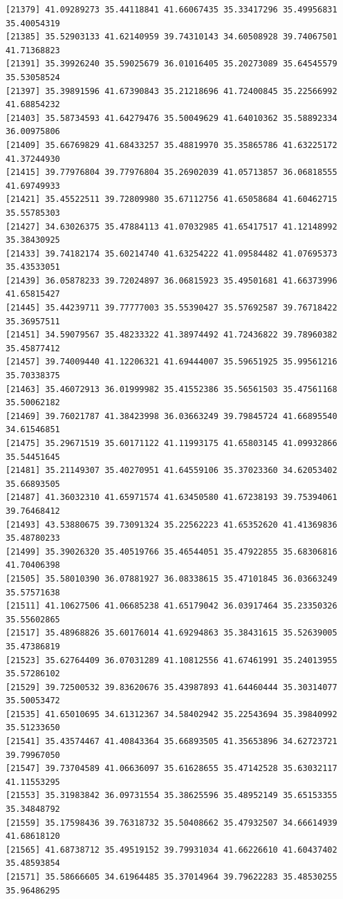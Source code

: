 \documentclass[
  letterpaper,
  DIV=11,
  numbers=noendperiod]{scrartcl}
\begin{document}
\begin{verbatim}
[21379] 41.09289273 35.44118841 41.66067435 35.33417296 35.49956831 35.40054319
[21385] 35.52903133 41.62140959 39.74310143 34.60508928 39.74067501 41.71368823
[21391] 35.39926240 35.59025679 36.01016405 35.20273089 35.64545579 35.53058524
[21397] 35.39891596 41.67390843 35.21218696 41.72400845 35.22566992 41.68854232
[21403] 35.58734593 41.64279476 35.50049629 41.64010362 35.58892334 36.00975806
[21409] 35.66769829 41.68433257 35.48819970 35.35865786 41.63225172 41.37244930
[21415] 39.77976804 39.77976804 35.26902039 41.05713857 36.06818555 41.69749933
[21421] 35.45522511 39.72809980 35.67112756 41.65058684 41.60462715 35.55785303
[21427] 34.63026375 35.47884113 41.07032985 41.65417517 41.12148992 35.38430925
[21433] 39.74182174 35.60214740 41.63254222 41.09584482 41.07695373 35.43533051
[21439] 36.05878233 39.72024897 36.06815923 35.49501681 41.66373996 41.65815427
[21445] 35.44239711 39.77777003 35.55390427 35.57692587 39.76718422 35.36957511
[21451] 34.59079567 35.48233322 41.38974492 41.72436822 39.78960382 35.45877412
[21457] 39.74009440 41.12206321 41.69444007 35.59651925 35.99561216 35.70338375
[21463] 35.46072913 36.01999982 35.41552386 35.56561503 35.47561168 35.50062182
[21469] 39.76021787 41.38423998 36.03663249 39.79845724 41.66895540 34.61546851
[21475] 35.29671519 35.60171122 41.11993175 41.65803145 41.09932866 35.54451645
[21481] 35.21149307 35.40270951 41.64559106 35.37023360 34.62053402 35.66893505
[21487] 41.36032310 41.65971574 41.63450580 41.67238193 39.75394061 39.76468412
[21493] 43.53880675 39.73091324 35.22562223 41.65352620 41.41369836 35.48780233
[21499] 35.39026320 35.40519766 35.46544051 35.47922855 35.68306816 41.70406398
[21505] 35.58010390 36.07881927 36.08338615 35.47101845 36.03663249 35.57571638
[21511] 41.10627506 41.06685238 41.65179042 36.03917464 35.23350326 35.55602865
[21517] 35.48968826 35.60176014 41.69294863 35.38431615 35.52639005 35.47386819
[21523] 35.62764409 36.07031289 41.10812556 41.67461991 35.24013955 35.57286102
[21529] 39.72500532 39.83620676 35.43987893 41.64460444 35.30314077 35.50053472
[21535] 41.65010695 34.61312367 34.58402942 35.22543694 35.39840992 35.51233650
[21541] 35.43574467 41.40843364 35.66893505 41.35653896 34.62723721 39.79967050
[21547] 39.73704589 41.06636097 35.61628655 35.47142528 35.63032117 41.11553295
[21553] 35.31983842 36.09731554 35.38625596 35.48952149 35.65153355 35.34848792
[21559] 35.17598436 39.76318732 35.50408662 35.47932507 34.66614939 41.68618120
[21565] 41.68738712 35.49519152 39.79931034 41.66226610 41.60437402 35.48593854
[21571] 35.58666605 34.61964485 35.37014964 39.79622283 35.48530255 35.96486295

\end{verbatim}
\end{document}
